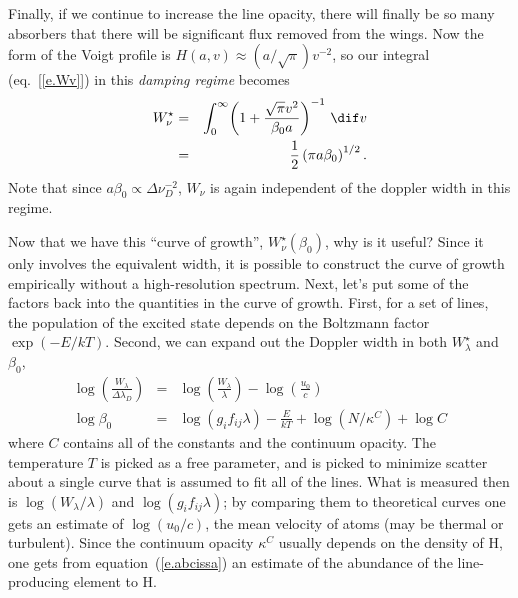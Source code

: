 Finally, if we continue to increase the line opacity, there will finally be so many absorbers that there will be significant flux removed from the wings.  Now the form of the Voigt profile is $H(a,v)\approx (a/\sqrt{\pi}) v^{-2}$, so our integral (eq.~[\ref{e.Wv}]) in this \emph{damping regime} becomes
\begin{eqnarray}\label{e.damping}
W_{\nu}^{\star} &=& \int_{0}^{\infty}\! \left(1+\frac{\sqrt{\pi}v^{2}}{\beta_{0}a}\right)^{-1}\, \dif v\nonumber\\
 &=& \frac{1}{2}\left(\pi a \beta_{0}\right)^{1/2}.
\end{eqnarray}
Note that since $a\beta_{0}\propto \Delta\nu_{D}^{-2}$, $W_{\nu}$ is again independent of the doppler width in this regime.

Now that we have this ``curve of growth'', $W_{\nu}^{\star}(\beta_{0})$, why is it useful? Since it only involves the equivalent width, it is possible to construct the curve of growth empirically without a high-resolution spectrum. Next, let's put some of the factors back into the quantities in the curve of growth.  First, for a set of lines, the population of the excited state depends on the Boltzmann factor $\exp(-E/kT)$. Second, we can expand out the Doppler width in both $W_{\lambda}^{\star}$ and $\beta_{0}$,
\begin{eqnarray}
\log\left(\frac{W_{\lambda}}{\Delta\lambda_{D}}\right) &=& \log\left(\frac{W_{\lambda}}{\lambda}\right) - \log\left(\frac{u_{0}}{c}\right)\label{e.ordinate}\\
\log\beta_{0} &=& \log(g_{i}f_{ij}\lambda) - \frac{E}{kT} +\log(N/\kappa^{C}) + \log C\label{e.abcissa}
\end{eqnarray}
where $C$ contains all of the constants and the continuum opacity.  The temperature $T$ is picked as a free parameter, and is picked to minimize scatter about a single curve that is assumed to fit all of the lines.  What is measured then is $\log(W_{\lambda}/\lambda)$ and $\log(g_{i}f_{ij}\lambda)$; by comparing them to theoretical curves one gets an estimate of $\log(u_{0}/c)$, the mean velocity of atoms (may be thermal or turbulent).  Since the continuum opacity $\kappa^{C}$ usually depends on the density of H, one gets from equation~(\ref{e.abcissa}) an estimate of the abundance of the line-producing element to H.

